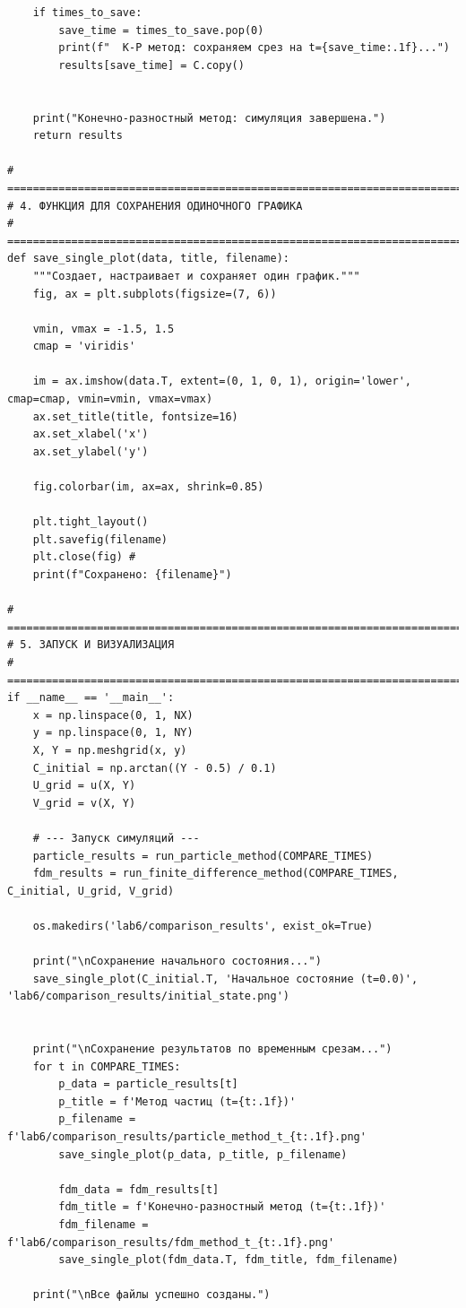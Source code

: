 \documentclass[a4paper,12pt]{article}
\begin{document}
\begin{verbatim}
    if times_to_save:
        save_time = times_to_save.pop(0)
        print(f"  К-Р метод: сохраняем срез на t={save_time:.1f}...")
        results[save_time] = C.copy()
    
        
    print("Конечно-разностный метод: симуляция завершена.")
    return results

# =============================================================================
# 4. ФУНКЦИЯ ДЛЯ СОХРАНЕНИЯ ОДИНОЧНОГО ГРАФИКА
# =============================================================================
def save_single_plot(data, title, filename):
    """Создает, настраивает и сохраняет один график."""
    fig, ax = plt.subplots(figsize=(7, 6))
    
    vmin, vmax = -1.5, 1.5
    cmap = 'viridis'
    
    im = ax.imshow(data.T, extent=(0, 1, 0, 1), origin='lower', cmap=cmap, vmin=vmin, vmax=vmax)
    ax.set_title(title, fontsize=16)
    ax.set_xlabel('x')
    ax.set_ylabel('y')
    
    fig.colorbar(im, ax=ax, shrink=0.85)
    
    plt.tight_layout()
    plt.savefig(filename)
    plt.close(fig) #
    print(f"Сохранено: {filename}")

# =============================================================================
# 5. ЗАПУСК И ВИЗУАЛИЗАЦИЯ
# =============================================================================
if __name__ == '__main__':
    x = np.linspace(0, 1, NX)
    y = np.linspace(0, 1, NY)
    X, Y = np.meshgrid(x, y)
    C_initial = np.arctan((Y - 0.5) / 0.1)
    U_grid = u(X, Y)
    V_grid = v(X, Y)

    # --- Запуск симуляций ---
    particle_results = run_particle_method(COMPARE_TIMES)
    fdm_results = run_finite_difference_method(COMPARE_TIMES, C_initial, U_grid, V_grid)

    os.makedirs('lab6/comparison_results', exist_ok=True)

    print("\nСохранение начального состояния...")
    save_single_plot(C_initial.T, 'Начальное состояние (t=0.0)', 'lab6/comparison_results/initial_state.png')

    
    print("\nСохранение результатов по временным срезам...")
    for t in COMPARE_TIMES:
        p_data = particle_results[t]
        p_title = f'Метод частиц (t={t:.1f})'
        p_filename = f'lab6/comparison_results/particle_method_t_{t:.1f}.png'
        save_single_plot(p_data, p_title, p_filename)
        
        fdm_data = fdm_results[t]
        fdm_title = f'Конечно-разностный метод (t={t:.1f})'
        fdm_filename = f'lab6/comparison_results/fdm_method_t_{t:.1f}.png'
        save_single_plot(fdm_data.T, fdm_title, fdm_filename)

    print("\nВсе файлы успешно созданы.")
\end{verbatim}
\end{document}
